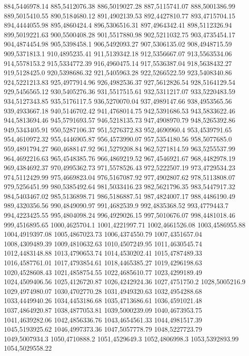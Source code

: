 884,5446978.14
885,5412076.38
886,5019027.28
887,5115741.07
888,5001386.99
889,5015410.55
890,5184680.12
891,4902139.53
892,4427810.77
893,4715704.15
894,4444055.98
895,4860424.4
896,5306516.31
897,4964342.41
898,5112326.94
899,5019221.63
900,5500408.28
901,5517880.98
902,5211032.75
903,4735454.17
904,4874454.98
905,5398458.1
906,5492093.27
907,5306135.02
908,4948715.59
909,5371813.1
910,4895235.41
911,5139342.18
912,5356667.07
913,5563534.06
914,5578153.2
915,5334772.39
916,4960475.14
917,5536387.04
918,5638432.27
919,5128425.0
920,5398686.32
921,5405963.28
922,5266522.59
923,5408340.86
924,5221213.83
925,4977914.96
926,4982536.37
927,5612826.54
928,5164129.54
929,5456565.12
930,5405276.36
931,5517515.61
932,5311217.07
933,5220483.59
934,5127343.85
935,5176117.5
936,5270070.04
937,4989147.66
938,4953565.56
939,4933667.18
940,5146702.42
941,4768014.75
942,5391686.53
943,5833622.46
944,5813694.46
945,5791693.57
946,5218135.73
947,4908970.79
948,5265392.86
949,5343405.91
950,5287106.37
951,5276372.83
952,4690960.4
953,4539791.65
954,4610972.32
955,4446905.87
956,4573990.07
957,5354180.56
958,5077685.0
959,4891794.27
960,4688147.92
961,5279208.84
962,5271814.59
963,5255537.99
964,4692216.63
965,4548385.76
966,4869219.52
967,4546921.67
968,4482978.19
969,4384692.37
970,4995362.73
971,5578526.43
972,5222507.19
973,4729534.23
974,5112429.99
975,4669823.04
976,5167087.92
977,4902807.62
978,5113808.07
979,5256451.99
980,5385492.64
981,5033416.23
982,5621796.35
983,5447917.32
984,5403467.02
985,5136898.71
986,5186887.51
987,4824007.17
988,4486190.49
989,4320356.56
990,4849090.97
991,4682539.9
992,4835368.52
993,4779443.7
994,4223425.55
995,4804098.24
996,4929026.15
997,5010676.07
998,4481018.46
999,4516895.65
1000,4625704.1
1001,4221997.71
1002,4661526.08
1003,4586955.88
1004,4919397.08
1005,4867023.73
1006,4374550.79
1007,4351657.04
1008,4309489.39
1009,4810632.63
1010,4507249.95
1011,4630545.74
1012,4483148.88
1013,4790653.74
1014,4530202.41
1015,4787489.33
1016,4587761.01
1017,4793854.61
1018,4465385.27
1019,4296198.63
1020,4528608.43
1021,4858754.55
1022,4685610.77
1023,4299189.49
1024,4509406.56
1025,4126720.87
1026,4242924.36
1027,4751750.2
1028,5005216.9
1029,4974980.07
1030,4702770.28
1031,4949320.63
1032,4954288.68
1033,4449940.26
1034,4453186.68
1035,4713686.61
1036,4591021.48
1037,4864920.87
1038,4877053.81
1039,5000239.09
1040,4673953.75
1041,4639282.06
1042,4856336.76
1043,4654561.33
1044,4981517.39
1045,5193925.62
1046,4997373.36
1047,5057778.79
1048,5227723.79
1049,5007934.3
1050,4710888.2
1051,4529649.3
1052,4806998.3
1053,5392893.99
1054,5029558.22
